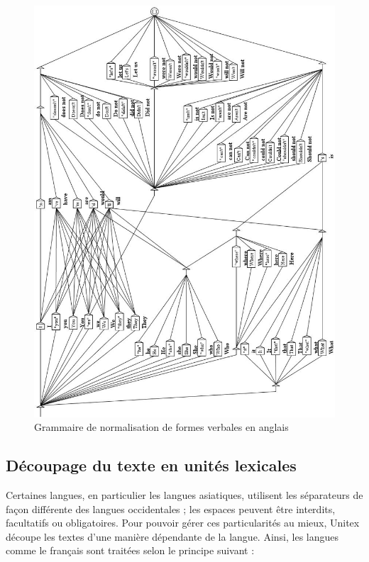 \begin{figure}[!p]
\begin{center}
\includegraphics[width=14cm]{resources/img/fig2-11.png}
\caption{Grammaire de normalisation de formes verbales en anglais\label{fig-normalization-grammar}}
\end{center}
\end{figure}



\subsection{Découpage du texte en unités lexicales}
\label{tokenization}
Certaines langues, en particulier les langues asiatiques, utilisent les séparateurs de façon
différente des langues occidentales ; les espaces peuvent être interdits, facultatifs ou
obligatoires. Pour pouvoir gérer ces particularités au mieux, Unitex découpe les textes d’une
manière dépendante de la langue. Ainsi, les langues comme le français sont traitées selon le
principe suivant :

